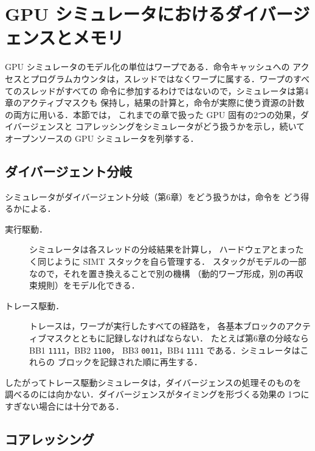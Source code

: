 \documentclass[../main.tex]{subfiles}
\begin{document}
\section{GPU シミュレータにおけるダイバージェンスとメモリ}
\label{sec:l08-divergence-memory}

GPU シミュレータのモデル化の単位はワープである．命令キャッシュへの
アクセスとプログラムカウンタは，スレッドではなくワープに属する．ワープのすべてのスレッドがすべての
命令に参加するわけではないので，シミュレータは第4章のアクティブマスクも
保持し，結果の計算と，命令が実際に使う資源の計数の両方に用いる．本節では，
これまでの章で扱った GPU 固有の2つの効果，ダイバージェンスと
コアレッシングをシミュレータがどう扱うかを示し，続いてオープンソースの
GPU シミュレータを列挙する．

\subsection{ダイバージェント分岐}

シミュレータがダイバージェント分岐（第6章）をどう扱うかは，命令を
どう得るかによる．
\begin{description}
  \item[実行駆動．]  シミュレータは各スレッドの分岐結果を計算し，
    ハードウェアとまったく同じように SIMT スタックを自ら管理する．
    スタックがモデルの一部なので，それを置き換えることで別の機構
    （動的ワープ形成，別の再収束規則）をモデル化できる．
  \item[トレース駆動．]  トレースは，ワープが実行したすべての経路を，
    各基本ブロックのアクティブマスクとともに記録しなければならない．
    たとえば第6章の分岐なら BB1 \texttt{1111}，BB2 \texttt{1100}，
    BB3 \texttt{0011}，BB4 \texttt{1111} である．シミュレータはこれらの
    ブロックを記録された順に再生する．
\end{description}
%
したがってトレース駆動シミュレータは，ダイバージェンスの処理そのものを
調べるのには向かない．ダイバージェンスがタイミングを形づくる効果の
1つにすぎない場合には十分である．

\subsection{コアレッシング}
\end{document}
